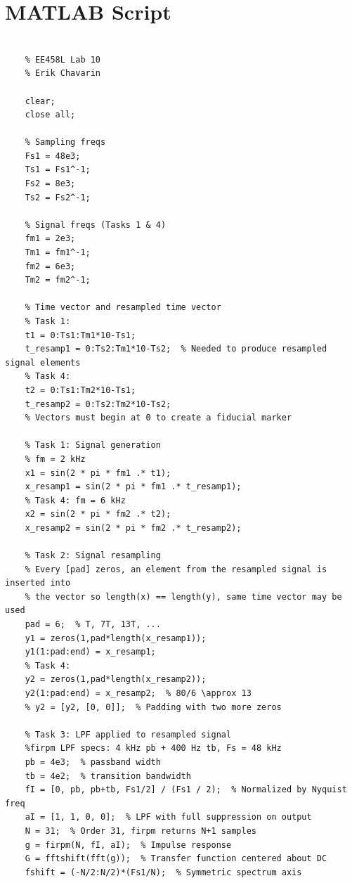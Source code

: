 \documentclass[a4paper,12pt]{article}
\begin{document}
\clearpage
\section*{MATLAB Script}

\begin{lstlisting}

    % EE458L Lab 10
    % Erik Chavarin
    
    clear;
    close all;
    
    % Sampling freqs
    Fs1 = 48e3;
    Ts1 = Fs1^-1;
    Fs2 = 8e3;
    Ts2 = Fs2^-1;
    
    % Signal freqs (Tasks 1 & 4)
    fm1 = 2e3;
    Tm1 = fm1^-1;
    fm2 = 6e3;
    Tm2 = fm2^-1;
    
    % Time vector and resampled time vector
    % Task 1:
    t1 = 0:Ts1:Tm1*10-Ts1;
    t_resamp1 = 0:Ts2:Tm1*10-Ts2;  % Needed to produce resampled signal elements
    % Task 4:
    t2 = 0:Ts1:Tm2*10-Ts1;
    t_resamp2 = 0:Ts2:Tm2*10-Ts2; 
    % Vectors must begin at 0 to create a fiducial marker
    
    % Task 1: Signal generation
    % fm = 2 kHz
    x1 = sin(2 * pi * fm1 .* t1);
    x_resamp1 = sin(2 * pi * fm1 .* t_resamp1);
    % Task 4: fm = 6 kHz
    x2 = sin(2 * pi * fm2 .* t2);
    x_resamp2 = sin(2 * pi * fm2 .* t_resamp2);
    
    % Task 2: Signal resampling
    % Every [pad] zeros, an element from the resampled signal is inserted into 
    % the vector so length(x) == length(y), same time vector may be used
    pad = 6;  % T, 7T, 13T, ...
    y1 = zeros(1,pad*length(x_resamp1));
    y1(1:pad:end) = x_resamp1;
    % Task 4:
    y2 = zeros(1,pad*length(x_resamp2));
    y2(1:pad:end) = x_resamp2;  % 80/6 \approx 13
    % y2 = [y2, [0, 0]];  % Padding with two more zeros
    
    % Task 3: LPF applied to resampled signal
    %firpm LPF specs: 4 kHz pb + 400 Hz tb, Fs = 48 kHz
    pb = 4e3;  % passband width
    tb = 4e2;  % transition bandwidth
    fI = [0, pb, pb+tb, Fs1/2] / (Fs1 / 2);  % Normalized by Nyquist freq
    aI = [1, 1, 0, 0];  % LPF with full suppression on output
    N = 31;  % Order 31, firpm returns N+1 samples
    g = firpm(N, fI, aI);  % Impulse response
    G = fftshift(fft(g));  % Transfer function centered about DC
    fshift = (-N/2:N/2)*(Fs1/N);  % Symmetric spectrum axis
    

\end{lstlisting}
\end{document}
